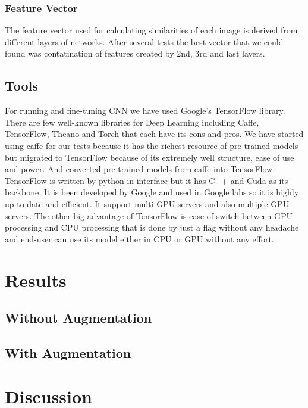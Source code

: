 \documentclass[10pt,twocolumn,letterpaper]{article}
\begin{document}
\subsubsection{Feature Vector}
The feature vector used for calculating similarities of each image is derived from different layers of networks. After several tests the best vector that we could found was contatination of features created by 2nd, 3rd and last layers.  

\subsection{Tools}
For running and fine-tuning CNN we have used Google's TensorFlow library. \cite{tensorflow} There are few well-known libraries for Deep Learning including Caffe\cite{caffe}, TensorFlow\cite{tensorflow}, Theano\cite{theano} and  Torch\cite{torch} that each have its cons and pros. We have started using caffe for our tests because it has the richest resource of pre-trained models but migrated to TensorFlow because of its extremely well structure, ease of use and power. And converted pre-trained models from caffe into TensorFlow. \\
TensorFlow is written by python in interface but it has C++ and Cuda as its backbone. It is been developed by Google and used in Google labs so it is highly up-to-date and efficient. It support multi GPU servers and also multiple GPU servers. The other big advantage of TensorFlow is ease of switch between GPU processing and CPU processing that is done by just a flag without any headache and end-user can use its model either in CPU or GPU without any effort.  
\section{Results}



\subsection{Without Augmentation}






\subsection{With Augmentation}


\section{Discussion}










{\small


}
\end{document}
